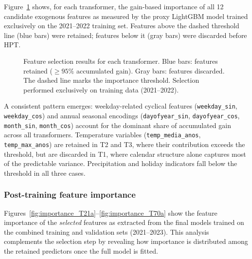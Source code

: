 Figure~\ref{fig:feature_selection} shows, for each transformer, the gain-based importance of all 12 candidate exogenous features as measured by the proxy LightGBM model trained exclusively on the 2021--2022 training set. Features above the dashed threshold line (blue bars) were retained; features below it (gray bars) were discarded before HPT.

\begin{figure}[!h]
\centering
\begin{subfigure}[t]{0.32\textwidth}
    \centering
    
\end{subfigure}
\begin{subfigure}[t]{0.32\textwidth}
    \centering
    
\end{subfigure}
\begin{subfigure}[t]{0.32\textwidth}
    \centering
    
\end{subfigure}
\caption{Feature selection results for each transformer. Blue bars: features retained ($\geq 95\%$ accumulated gain). Gray bars: features discarded. The dashed line marks the importance threshold. Selection performed exclusively on training data (2021--2022).}
\label{fig:feature_selection}
\end{figure}

A consistent pattern emerges: weekday-related cyclical features (\texttt{weekday\_sin}, \texttt{weekday\_cos}) and annual seasonal encodings (\texttt{dayofyear\_sin}, \texttt{dayofyear\_cos}, \texttt{month\_sin}, \texttt{month\_cos}) account for the dominant share of accumulated gain across all transformers. Temperature variables (\texttt{temp\_media\_anos}, \texttt{temp\_max\_anos}) are retained in T2 and T3, where their contribution exceeds the threshold, but are discarded in T1, where calendar structure alone captures most of the predictable variance. Precipitation and holiday indicators fall below the threshold in all three cases.

\subsubsection{Post-training feature importance}

Figures~\ref{fig:importance_T21a}--\ref{fig:importance_T70a} show the feature importance of the \emph{selected} features as extracted from the final models trained on the combined training and validation sets (2021--2023). This analysis complements the selection step by revealing how importance is distributed among the retained predictors once the full model is fitted.

